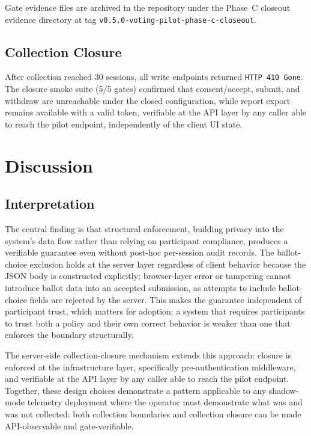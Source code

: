 \documentclass[conference]{IEEEtran}
\begin{document}
Gate evidence files are archived in the repository under the Phase~C closeout
evidence directory at tag \texttt{v0.5.0-voting-pilot-phase-c-closeout}.

\subsection{Collection Closure}

After collection reached 30 sessions, all write endpoints returned
\texttt{HTTP~410 Gone}. The closure smoke suite (5/5 gates) confirmed that
consent/accept, submit, and withdraw are unreachable under the closed
configuration, while report export remains available with a valid token,
verifiable at the API layer by any caller able to reach the pilot endpoint,
independently of the client UI state.

\section{Discussion}

\subsection{Interpretation}

The central finding is that structural enforcement, building privacy into the
system's data flow rather than relying on participant compliance, produces a
verifiable guarantee even without post-hoc per-session audit records. The
ballot-choice exclusion holds at the server layer regardless of client behavior
because the JSON body is constructed explicitly; browser-layer error or tampering
cannot introduce ballot data into an accepted submission, as attempts to include
ballot-choice fields are rejected by the server.
This makes the guarantee independent of participant trust, which matters for
adoption: a system that requires participants to trust both a policy and their
own correct behavior is weaker than one that enforces the boundary structurally.

The server-side collection-closure mechanism extends this approach: closure is
enforced at the infrastructure layer, specifically pre-authentication middleware,
and verifiable at the API layer by any caller able to reach the pilot endpoint.
Together, these design choices demonstrate a pattern applicable to any
shadow-mode telemetry deployment where the operator must demonstrate what was
and was not collected: both collection boundaries and collection closure can be
made API-observable and gate-verifiable.
\end{document}
